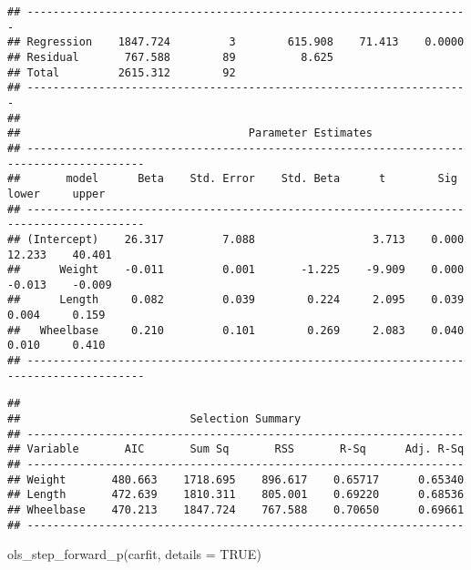 \documentclass[
]{book}
\newenvironment{Shaded}{\begin{snugshade}}{\end{snugshade}}
\newcommand{\AttributeTok}[1]{\textcolor[rgb]{0.77,0.63,0.00}{#1}}
\newcommand{\ConstantTok}[1]{\textcolor[rgb]{0.00,0.00,0.00}{#1}}
\newcommand{\FunctionTok}[1]{\textcolor[rgb]{0.00,0.00,0.00}{#1}}
\newcommand{\NormalTok}[1]{#1}
\begin{document}
\begin{verbatim}
## --------------------------------------------------------------------
## Regression    1847.724         3        615.908    71.413    0.0000 
## Residual       767.588        89          8.625                     
## Total         2615.312        92                                    
## --------------------------------------------------------------------
## 
##                                   Parameter Estimates                                    
## ----------------------------------------------------------------------------------------
##       model      Beta    Std. Error    Std. Beta      t        Sig      lower     upper 
## ----------------------------------------------------------------------------------------
## (Intercept)    26.317         7.088                  3.713    0.000    12.233    40.401 
##      Weight    -0.011         0.001       -1.225    -9.909    0.000    -0.013    -0.009 
##      Length     0.082         0.039        0.224     2.095    0.039     0.004     0.159 
##   Wheelbase     0.210         0.101        0.269     2.083    0.040     0.010     0.410 
## ----------------------------------------------------------------------------------------
\end{verbatim}

\begin{verbatim}
## 
##                          Selection Summary                          
## -------------------------------------------------------------------
## Variable       AIC       Sum Sq       RSS       R-Sq      Adj. R-Sq 
## -------------------------------------------------------------------
## Weight       480.663    1718.695    896.617    0.65717      0.65340 
## Length       472.639    1810.311    805.001    0.69220      0.68536 
## Wheelbase    470.213    1847.724    767.588    0.70650      0.69661 
## -------------------------------------------------------------------
\end{verbatim}

\begin{Shaded}
\begin{Highlighting}[]
\FunctionTok{ols\_step\_forward\_p}\NormalTok{(carfit, }\AttributeTok{details =} \ConstantTok{TRUE}\NormalTok{)}
\end{Highlighting}
\end{Shaded}
\end{document}
